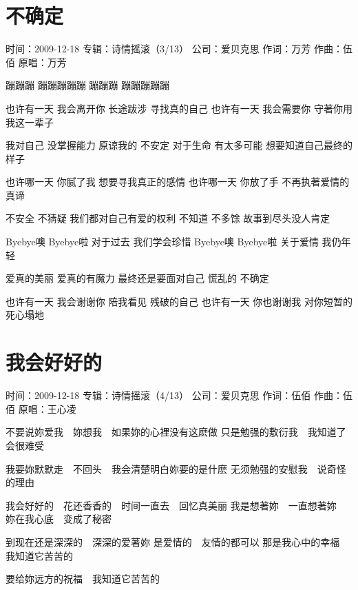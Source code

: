 \documentclass[UTF8,a4paper,oneside,twocolumn,12pt]{ctexbook}
\newcommand{\infopair}[2]{\textbullet #1：#2}
\newcommand{\zc}[1][伍佰]{\infopair{作词}{#1}}
\newcommand{\zq}[1][伍佰]{\infopair{作曲}{#1}}
\newcommand{\zj}[1]{\infopair{专辑}{#1}}
\newcommand{\yc}[1]{\infopair{原唱}{#1}}
\newcommand{\sj}[1]{\infopair{时间}{#1}}
\newcommand{\gs}[1]{\infopair{公司}{#1}}
\newenvironment{info}{\begin{flushleft}\kaishu
	}
	{\end{flushleft}\normalsize\yahei\par}
\newenvironment{lyric}{
	}
{}
\begin{document}
\section{不确定}
\begin{info}
	\sj{2009-12-18}
	\zj{诗情摇滚（3/13）}
	\gs{爱贝克思}
	\zc[万芳]
	\zq
	\yc{万芳}
\end{info}
\begin{lyric}
	蹦蹦蹦 蹦蹦蹦蹦蹦 蹦蹦蹦 蹦蹦蹦蹦蹦

	也许有一天 我会离开你
	长途跋涉 寻找真的自己
	也许有一天 我会需要你
	守著你用我这一辈子

	我对自己 没掌握能力
	原谅我的 不安定
	对于生命 有太多可能
	想要知道自己最终的样子

	也许哪一天 你腻了我
	想要寻我真正的感情
	也许哪一天 你放了手
	不再执著爱情的真谛

	不安全 不猜疑
	我们都对自己有爱的权利
	不知道 不多馀
	故事到尽头没人肯定

	Byebye噢 Byebye啦
	对于过去 我们学会珍惜
	Byebye噢 Byebye啦
	关于爱情 我仍年轻

	爱真的美丽 爱真的有魔力
	最终还是要面对自己
	慌乱的 不确定

	也许有一天 我会谢谢你
	陪我看见 残破的自己
	也许有一天 你也谢谢我
	对你短暂的死心塌地
\end{lyric}

\section{我会好好的}
\begin{info}
	\sj{2009-12-18}
	\zj{诗情摇滚（4/13）}
	\gs{爱贝克思}
	\zc
	\zq
	\yc{王心凌}
\end{info}
\begin{lyric}
	不要说妳爱我　妳想我　如果妳的心裡没有这麽做
	只是勉强的敷衍我　我知道了会很难受

	我要妳默默走　不回头　我会清楚明白妳要的是什麽
	无须勉强的安慰我　说奇怪的理由

	我会好好的　花还香香的　时间一直去　回忆真美丽
	我是想著妳　一直想著妳　妳在我心底　变成了秘密

	到现在还是深深的　深深的爱著妳
	是爱情的　友情的都可以
	那是我心中的幸福　我知道它苦苦的

	要给妳远方的祝福　我知道它苦苦的
\end{lyric}
\end{document}
